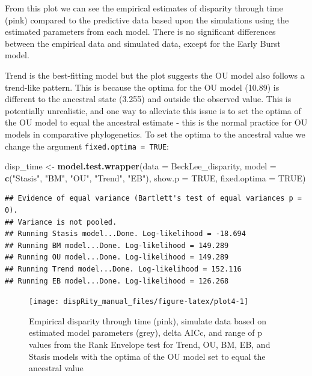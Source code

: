 \documentclass[
]{book}
\newenvironment{Shaded}{\begin{snugshade}}{\end{snugshade}}
\newcommand{\DataTypeTok}[1]{\textcolor[rgb]{0.13,0.29,0.53}{#1}}
\newcommand{\KeywordTok}[1]{\textcolor[rgb]{0.13,0.29,0.53}{\textbf{#1}}}
\newcommand{\NormalTok}[1]{#1}
\newcommand{\OtherTok}[1]{\textcolor[rgb]{0.56,0.35,0.01}{#1}}
\newcommand{\StringTok}[1]{\textcolor[rgb]{0.31,0.60,0.02}{#1}}
\begin{document}
From this plot we can see the empirical estimates of disparity through time (pink) compared to the predictive data based upon the simulations using the estimated parameters from each model.
There is no significant differences between the empirical data and simulated data, except for the Early Burst model.

Trend is the best-fitting model but the plot suggests the OU model also follows a trend-like pattern.
This is because the optima for the OU model (10.89) is different to the ancestral state (3.255) and outside the observed value.
This is potentially unrealistic, and one way to alleviate this issue is to set the optima of the OU model to equal the ancestral estimate - this is the normal practice for OU models in comparative phylogenetics.
To set the optima to the ancestral value we change the argument \texttt{fixed.optima\ =\ TRUE}:

\begin{Shaded}
\begin{Highlighting}[]
\NormalTok{disp\_time \textless{}{-}}\StringTok{ }\KeywordTok{model.test.wrapper}\NormalTok{(}\DataTypeTok{data =}\NormalTok{ BeckLee\_disparity,}
                    \DataTypeTok{model =} \KeywordTok{c}\NormalTok{(}\StringTok{"Stasis"}\NormalTok{, }\StringTok{"BM"}\NormalTok{, }\StringTok{"OU"}\NormalTok{, }\StringTok{"Trend"}\NormalTok{, }\StringTok{"EB"}\NormalTok{),}
                                \DataTypeTok{show.p =} \OtherTok{TRUE}\NormalTok{, }\DataTypeTok{fixed.optima =} \OtherTok{TRUE}\NormalTok{)}
\end{Highlighting}
\end{Shaded}

\begin{verbatim}
## Evidence of equal variance (Bartlett's test of equal variances p = 0).
## Variance is not pooled.
## Running Stasis model...Done. Log-likelihood = -18.694
## Running BM model...Done. Log-likelihood = 149.289
## Running OU model...Done. Log-likelihood = 149.289
## Running Trend model...Done. Log-likelihood = 152.116
## Running EB model...Done. Log-likelihood = 126.268
\end{verbatim}

\begin{figure}

{\centering \texttt{[image: dispRity\_manual\_files/figure-latex/plot4-1]} 

}

\caption{Empirical disparity through time (pink), simulate data based on estimated model parameters (grey), delta AICc, and range of p values from the Rank Envelope test for Trend, OU, BM, EB, and Stasis models with the optima of the OU model set to equal the ancestral value}\label{fig:plot4}
\end{figure}
\end{document}

